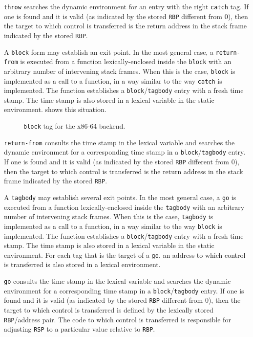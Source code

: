 \texttt{throw} searches the dynamic environment for an entry with the
right \texttt{catch} tag.  If one is found and it is valid (as
indicated by the stored \texttt{RBP} different from 0), then the
target to which control is transferred is the return address in the
stack frame indicated by the stored \texttt{RBP}.

A \texttt{block} form may establish an exit point.  In the most
general case, a \texttt{return-from} is executed from a function
lexically-enclosed inside the \texttt{block} with an arbitrary number
of intervening stack frames.  When this is the case, \texttt{block} is
implemented as a call to a function, in a way similar to the way
\texttt{catch} is implemented.  The function establishes a
\texttt{block}/\texttt{tagbody} entry with a fresh time stamp.  The
time stamp is also stored in a lexical variable in the static
environment.   shows this situation.

\begin{figure}
\begin{center}
\end{center}
\caption{\label{fig-x86-64-block-tag}
\texttt{block} tag for the x86-64 backend.}
\end{figure}

\texttt{return-from} consults the time stamp in the lexical variable
and searches the dynamic environment for a corresponding time stamp in
a \texttt{block}/\texttt{tagbody} entry.  If one is found and it is
valid (as indicated by the stored \texttt{RBP} different from 0), then
the target to which control is transferred is the return address in
the stack frame indicated by the stored \texttt{RBP}.

A \texttt{tagbody} may establish several exit points.  In the most
general case, a \texttt{go} is executed from a function
lexically-enclosed inside the \texttt{tagbody} with an arbitrary
number of intervening stack frames.  When this is the case,
\texttt{tagbody} is implemented as a call to a function, in a way
similar to the way \texttt{block} is implemented.  The function
establishes a \texttt{block}/\texttt{tagbody} entry with a fresh time
stamp.  The time stamp is also stored in a lexical variable in the
static environment.  For each tag that is the target of a \texttt{go},
an address to which control is transferred is also stored in a lexical
environment.

\texttt{go} consults the time stamp in the lexical variable and
searches the dynamic environment for a corresponding time stamp in a
\texttt{block}/\texttt{tagbody} entry.  If one is found and it is
valid (as indicated by the stored \texttt{RBP} different from 0), then
the target to which control is transferred is defined by the lexically
stored \texttt{RBP}/address pair.  The code to which control is
transferred is responsible for adjusting \texttt{RSP} to a particular
value relative to \texttt{RBP}.

